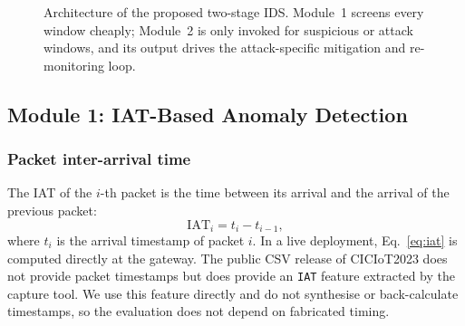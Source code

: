 \documentclass[]{interact}
\theoremstyle{plain}
\theoremstyle{definition}
\begin{document}
\begin{figure}[t]
{}
\caption{Architecture of the proposed two-stage IDS. Module~1 screens every window cheaply; Module~2 is only invoked for suspicious or attack windows, and its output drives the attack-specific mitigation and re-monitoring loop.}
\label{fig:arch}
\end{figure}

\subsection{Module 1: IAT-Based Anomaly Detection}

\subsubsection{Packet inter-arrival time}
The IAT of the $i$-th packet is the time between its arrival and the arrival of the previous packet:
\begin{equation}
  \mathrm{IAT}_i = t_i - t_{i-1},
  \label{eq:iat}
\end{equation}
where $t_i$ is the arrival timestamp of packet $i$. In a live deployment, Eq.~\eqref{eq:iat} is computed directly at the gateway. The public CSV release of CICIoT2023 does not provide packet timestamps but does provide an \texttt{IAT} feature extracted by the capture tool. We use this feature directly and do not synthesise or back-calculate timestamps, so the evaluation does not depend on fabricated timing.
\end{document}
